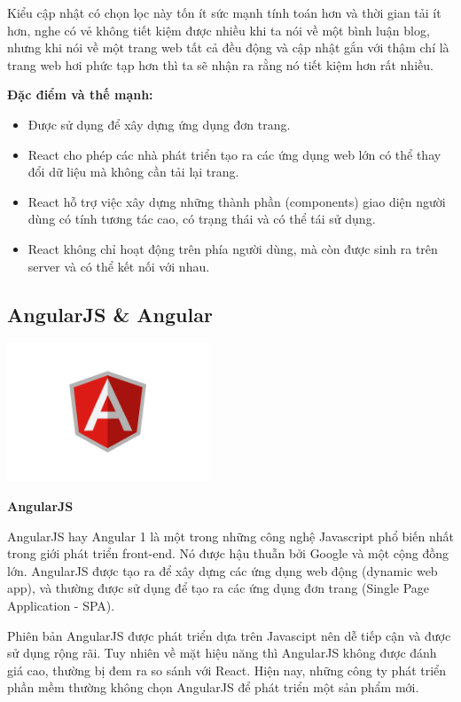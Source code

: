 Kiểu cập nhật có chọn lọc này tốn ít sức mạnh tính toán hơn và thời gian tải ít hơn, nghe có vẻ không tiết kiệm được nhiều khi ta nói về một bình luận blog, nhưng khi nói về một trang web tất cả đều động và cập nhật gắn với thậm chí là trang web hơi phức tạp hơn thì ta sẽ nhận ra rằng nó tiết kiệm hơn rất nhiều.

\textbf{Đặc điểm và thế mạnh:}
\begin {itemize}
\item Được sử dụng để xây dựng ứng dụng đơn trang.
\item React cho phép các nhà phát triển tạo ra các ứng dụng web lớn có thể thay đổi dữ liệu mà không cần tải lại trang.
\item React hỗ trợ việc xây dựng những thành phần (components) giao diện người dùng có tính tương tác cao, có trạng thái và có thể tái sử dụng.
\item React không chỉ hoạt động trên phía người dùng, mà còn được sinh ra trên server và có thể kết nối với nhau.
\end {itemize}

\subsection{AngularJS \& Angular}
\begin{center}
  \captionsetup{type=figure}
  \includegraphics[width=6cm]{img/angular-logo.png}
\end{center}
\textbf{AngularJS}

AngularJS hay Angular 1 là một trong những công nghệ Javascript phổ biến nhất trong giới phát triển front-end. Nó được hậu thuẫn bởi Google và một cộng đồng lớn. AngularJS được tạo ra để xây dựng các ứng dụng web động (dynamic web app), và thường được sử dụng để tạo ra các ứng dụng đơn trang (Single Page Application - SPA).

Phiên bản AngularJS được phát triển dựa trên Javascipt nên dễ tiếp cận và được sử dụng rộng rãi. Tuy nhiên về mặt hiệu năng thì AngularJS không được đánh giá cao, thường bị đem ra so sánh với React. Hiện nay, những công ty phát triển phần mềm thường không chọn AngularJS để phát triển một sản phẩm mới.

